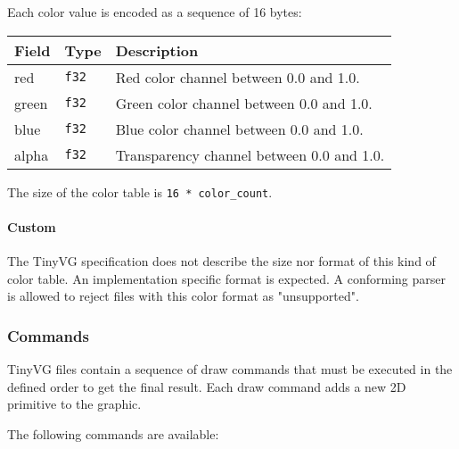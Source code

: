 \documentclass[]{article}
\begin{document}
Each color value is encoded as a sequence of 16 bytes:

\begin{longtable}[]{@{}p{0.5in}p{0.5in}p{5.0in}@{}}
\toprule
Field & Type & Description \\
\midrule
\endhead
red & \texttt{f32} & Red color channel between 0.0 and 1.0. \\
green & \texttt{f32} & Green color channel between 0.0 and 1.0. \\
blue & \texttt{f32} & Blue color channel between 0.0 and 1.0. \\
alpha & \texttt{f32} & Transparency channel between 0.0 and 1.0. \\
\bottomrule
\end{longtable}

The size of the color table is \texttt{16\ *\ color\_count}.

\hypertarget{custom}{\paragraph{Custom}\label{custom}}

The TinyVG specification does not describe the size nor format of this
kind of color table. An implementation specific format is expected. A
conforming parser is allowed to reject files with this color format as
"unsupported".

\hypertarget{commands}{\subsubsection{Commands}\label{commands}}

TinyVG files contain a sequence of draw commands that must be executed
in the defined order to get the final result. Each draw command adds a
new 2D primitive to the graphic.

The following commands are available:
\end{document}
